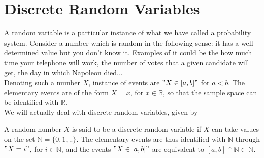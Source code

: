 \section{Discrete Random Variables}
	

A random variable is a particular instance of what we have called a probability system. Consider a number which is random in the following sense: it has a well determined value but you don't know it. Examples of it could be the how much time your telephone will work, the number of votes that a given candidate will get, the day in which Napoleon died... \\
Denoting such a number $X$, instance of events are $ "X \in [a,b]"$ for $a < b$. The elementary events are of the form $ X = x$, for $x \in \mathbb R$, so that the sample space can be identified with $\mathbb R$. \\
We will actually deal with discrete random variables, given by 
	\begin{definition} \label{d:random_variable}
		A random number $X$ is said to be a discrete random variable if $X$ can take values on the set $\mathbb N = \{0,1,..\}$. The elementary events are  thus identified with $\mathbb N$ through $"X = i"$, for $i\in \mathbb N$, and the events $ "X \in [a,b]"$ are equivalent to $ [a,b]\cap \mathbb N \subset \mathbb N$.  
	\end{definition}

